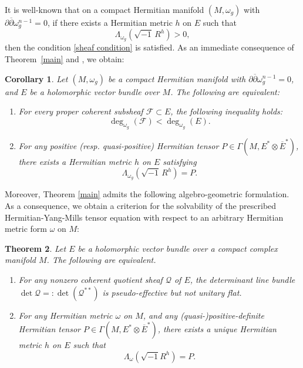 \documentclass[12pt, reqno]{amsart}
\newcommand\cF{{\mathcal F}}
\newcommand\cQ{{\mathcal Q}}
\newcommand\bp{{\bar\partial}}
\theoremstyle{plain}
\newtheorem{thm}{Theorem}[section]
\newtheorem{cor}[thm]{Corollary}
\theoremstyle{definition}
\newcommand{\btheorem}{\begin{thm}}
\newcommand{\etheorem}{\end{thm}}
\newcommand{\bcorollary}{\begin{cor}}
\newcommand{\ecorollary}{\end{cor}}
\newcommand{\sq}{\sqrt{-1}}
\newcommand{\p}{\partial}
\renewcommand{\bar}{\overline}
\newcommand{\bd}{\begin{enumerate}}
\newcommand{\ed}{\end{enumerate}}
\renewcommand{\bp}{\bar{\partial}}
\newcommand{\ts}{\otimes}
\renewcommand{\>}{\rightarrow}
\renewcommand{\>}{\rightarrow}
\renewcommand{\p}{{\partial}}
\renewcommand{\bp}{{\bar{\partial}}}
\newcommand{\om}{\omega}
\renewcommand{\bar}{\overline}
\numberwithin{equation}{section} %
\begin{document}
It is well-known that on a compact Hermitian manifold $(M,\omega_g)$  with
$\partial\bar{\partial}\omega_g^{n-1}=0$,  if   there exists a Hermitian  metric $h$ on $E$ such that
$$\Lambda_{\om_g}\left(\sqrt{-1}\, R^{h}\right) >0,$$
then the condition \eqref{sheaf condition} is satisfied. As an
immediate consequence of Theorem~\ref{main} and
\cite[Theorem~1.2]{XYY26+}, we obtain: \bcorollary \label{main2} Let
$(M,\om_g)$ be a compact Hermitian manifold with
$\p\bp\omega_g^{n-1}=0$, and $E$ be a holomorphic vector bundle over
$M$. The following are equivalent: \bd \item For every proper
coherent subsheaf $\cF\subset E$, the following inequality holds:
$$
\deg_{\omega_g}(\cF)<\deg_{\omega_g}(E).
$$
\item For  any positive (resp. quasi-positive) Hermitian tensor $P\in \Gamma(M,E^*\ts \overline E^*)$,  there exists a Hermitian metric  $h$ on $E$ satisfying
$$
\Lambda_{\om_g}\left(\sqrt{-1}\, R^{h}\right) = P.
$$
\ed
\ecorollary






 Moreover, Theorem \ref{main} admits the following algebro-geometric formulation. As a consequence, we obtain a criterion for the solvability of the prescribed Hermitian-Yang-Mills tensor equation with respect to an arbitrary Hermitian metric form $\omega$ on $M$:
\btheorem\label{main4} Let $E$ be a holomorphic vector bundle over a compact complex manifold $M$. The following are equivalent.
\bd \item For any nonzero coherent quotient sheaf $\cQ$ of $E$, the determinant line bundle $\det\cQ=:\det(\cQ^{**})$ is pseudo-effective but not unitary flat.

\item For any Hermitian metric $\omega$ on $M$,  and any (quasi-)positive-definite Hermitian tensor $P\in \Gamma(M,E^*\ts \bar E^*)$, there exists a unique Hermitian metric $h$ on $E$ such that 
$$\Lambda_\omega\left(\sq R^h\right)=P.$$
\ed 

\etheorem
\end{document}

